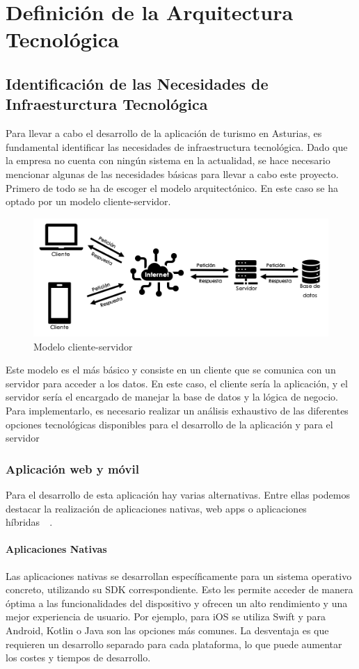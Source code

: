 \chapter{Definición de la Arquitectura Tecnológica}
\section{Identificación de las Necesidades de Infraesturctura Tecnológica}
Para llevar a cabo el desarrollo de la aplicación de turismo en Asturias, es fundamental identificar las necesidades de infraestructura tecnológica. Dado que la empresa no cuenta con ningún sistema en la actualidad, se hace necesario mencionar algunas de las necesidades básicas para llevar a cabo este proyecto.\\[1ex]Primero de todo se ha de escoger el modelo arquitectónico. En este caso se ha optado por un modelo cliente-servidor.\\[1ex]
\begin{figure}[H]
	\centering
	\includegraphics[width=13cm]{2-DefinicionDeLaArquitecturaTecnologica/arquitectura.png}
	\caption{Modelo cliente-servidor}
\end{figure}
Este modelo es el más básico y consiste en un cliente que se comunica con un servidor para acceder a los datos. En este caso, el cliente sería la aplicación, y el servidor sería el encargado de manejar la base de datos y la lógica de negocio.
Para implementarlo, es necesario realizar un análisis exhaustivo de las diferentes opciones tecnológicas disponibles para el desarrollo de la aplicación y para el servidor
\subsection{Aplicación web y móvil}
Para el desarrollo de esta aplicación hay varias alternativas. Entre ellas podemos destacar la realización de aplicaciones nativas, web apps o aplicaciones híbridas~\cite{nativas_vs_web_vs_hibridas}~\cite{web_vs_nativas_vs_hibridas}.
\subsubsection{Aplicaciones Nativas}
Las aplicaciones nativas se desarrollan específicamente para un sistema operativo concreto, utilizando su SDK correspondiente. Esto les permite acceder de manera óptima a las funcionalidades del dispositivo y ofrecen un alto rendimiento y una mejor experiencia de usuario. Por ejemplo, para iOS se utiliza Swift y para Android, Kotlin o Java son las opciones más comunes. La desventaja es que requieren un desarrollo separado para cada plataforma, lo que puede aumentar los costes y tiempos de desarrollo.
